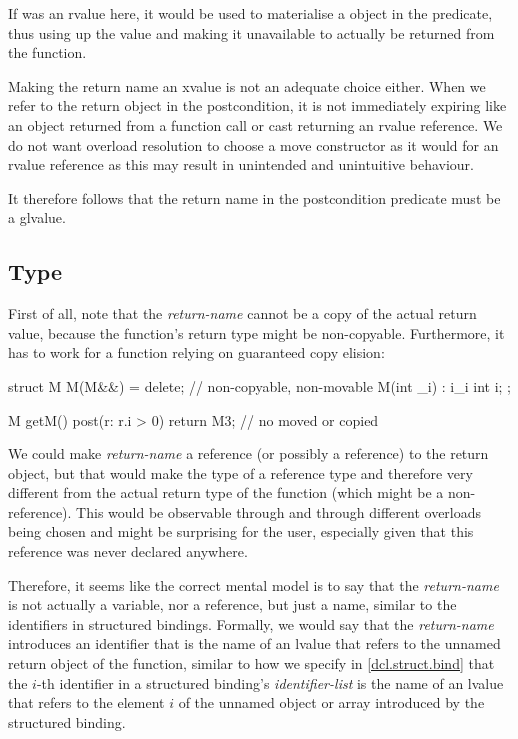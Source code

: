 If  was an rvalue here, it would be used to materialise a  object in the predicate, thus using up the value and making it unavailable to actually be returned from the function.

Making the return name an xvalue is not an adequate choice either. When we refer to the return object in the postcondition, it is not immediately expiring like an object returned from a function call or cast returning an rvalue reference.  We do not want overload resolution to choose a move constructor as it would for an rvalue reference as this may result in unintended and unintuitive behaviour.

It therefore follows that the return name in the postcondition predicate must be a glvalue.

\subsection{Type}

First of all, note that the \emph{return-name} cannot be a copy of the actual return value, because the function's return type might be non-copyable. Furthermore, it has to work for a function relying on guaranteed copy elision:

\begin{codeblock}
struct M {
  M(M&&) = delete; // non-copyable, non-movable
  M(int _i) : i{_i}  {}
  int i;
};

M getM()
  post(r: r.i > 0)
{
  return M{3}; // no  moved or copied
}
\end{codeblock}

We could make \emph{return-name} a reference (or possibly a  reference) to the return object, but that would make the type of  a reference type and therefore very different from the actual return type of the function (which might be a non-reference). This would be observable through  and through different overloads being chosen and might be surprising for the user, especially given that this reference was never declared anywhere.

Therefore, it seems like the correct mental model is to say that the \emph{return-name} is not actually a variable, nor a reference, but just a name, similar to the identifiers in structured bindings. Formally, we would say that the \emph{return-name} introduces an identifier that is the name of an lvalue that refers to the unnamed return object of the function, similar to how we specify in \href{https://eel.is/c++draft/dcl.struct.bind}{[dcl.struct.bind]} that the $i$-th identifier in a structured binding's \emph{identifier-list} is the name of an lvalue that refers to the element $i$ of the unnamed object or array introduced by the structured binding.

